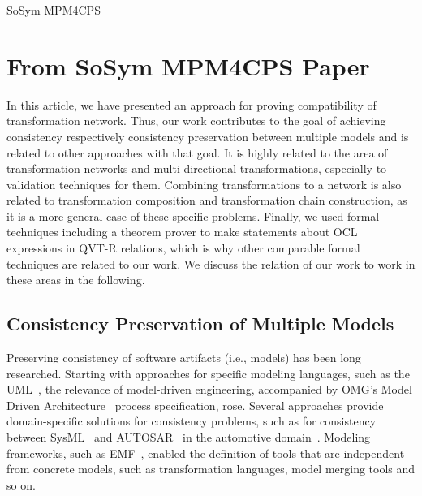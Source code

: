 \begin{copiedFrom}{SoSym MPM4CPS}

\section*{From SoSym MPM4CPS Paper}

In this article, we have presented an approach for proving compatibility of transformation network.
Thus, our work contributes to the goal of achieving consistency respectively consistency preservation between multiple models and is related to other approaches with that goal.
It is highly related to the area of transformation networks and multi-directional transformations, especially to validation techniques for them.
Combining transformations to a network is also related to transformation composition and transformation chain construction, as it is a more general case of these specific problems.
Finally, we used formal techniques including a theorem prover to make statements about OCL expressions in QVT-R relations, which is why other comparable formal techniques are related to our work.
We discuss the relation of our work to work in these areas in the following.


\subsection*{Consistency Preservation of Multiple Models}
Preserving consistency of software artifacts (i.e., models) has been long researched.
Starting with approaches for specific modeling languages, such as the UML~\cite{dantas2005umlsync}, the relevance of model-driven engineering, accompanied by OMG's Model Driven Architecture~\cite{mda} process specification, rose.
Several approaches provide domain-specific solutions for consistency problems, such as for consistency between SysML~\cite{sysml} and AUTOSAR~\cite{scheid2015autosar} in the automotive domain~\cite{giese2010a}.
Modeling frameworks, such as \gls{EMF}~\cite{steinberg2009emf}, enabled the definition of tools that are independent from concrete models, such as transformation languages, model merging tools and so on.


\end{copiedFrom}
